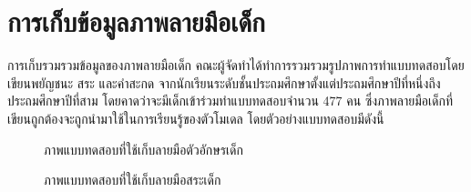 \documentclass[12pt,oneside,openright,a4paper]{cpe-thai-project}
\begin{document}
\section{การเก็บข้อมูลภาพลายมือเด็ก}
การเก็บรวมรวมข้อมูลของภาพลายมือเด็ก คณะผู้จัดทำได้ทำการรวมรวมรูปภาพการทำแบบทดสอบโดยเขียนพยัญชนะ สระ และคำสะกด 
จากนักเรียนระดับชั้นประถมศึกษาตั้งแต่ประถมศึกษาปีที่หนึ่งถึงประถมศึกษาปีที่สาม โดยคาดว่าจะมีเด็กเข้าร่วมทำแบบทดสอบจำนวน 477
คน ซึ่งภาพลายมือเด็กที่เขียนถูกต้องจะถูกนำมาใช้ในการเรียนรู้ของตัวโมเดล โดยตัวอย่างแบบทดสอบมีดังนี้
\begin{figure}[!ht]\centering
  \setlength{\fboxrule}{0.2mm} %
  \setlength{\fboxsep}{1cm}
  \caption{ภาพแบบทดสอบที่ใช้เก็บลายมือตัวอักษรเด็ก}\label{fig:system}
    
\end{figure}
\newpage
\begin{figure}[!ht]\centering
  \setlength{\fboxrule}{0.2mm} %
  \setlength{\fboxsep}{1cm}
  \caption{ภาพแบบทดสอบที่ใช้เก็บลายมือสระเด็ก}\label{fig:system}
    
\end{figure}
\end{document}
